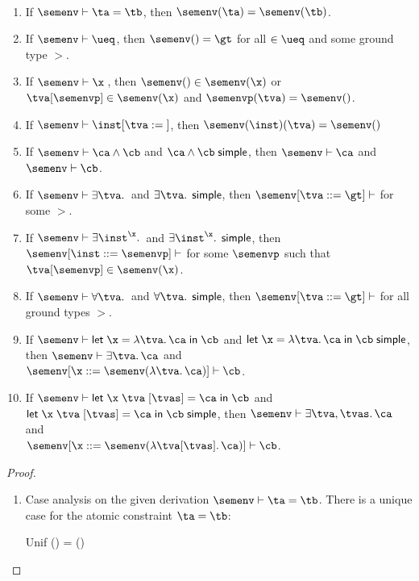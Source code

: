 \documentclass[acmsmall,screen,nonacm,review]{acmart}
\begin{document}
\begin{lemma}~
  \label{lem:simple-inversion}
  \begin{enumerate}[(\roman*)]
    \item If $\semenv \th \cunif \ta \tb$, then $\semenv(\ta) = \semenv(\tb)$.
    \item If $\semenv \th \ueq$, then $\semenv(\t) = \gt$ for all $\t \in \ueq$ and some ground type $\gt$.
    \item If $\semenv \th \capp \x \t$, then $\semenv(\t) \in \semenv(\x)$ or $\greg \tv \semenvp \in \semenv(\x)$ and $\semenvp(\tv) = \semenv(\t)$.
    \item If $\semenv \th \cpinst \inst \tv \t$, then $\semenv(\inst)(\tv) = \semenv(\t)$

    \item If $\semenv \th \ca \cand \cb$ and $\ca \cand \cb \simple$, then $\semenv \th \ca$ and $\semenv \th \cb$.
    \item If $\semenv \th \cexists \tv \c$ and $\cexists \tv \c \simple$, then $\semenv\where{\tv \is \gt} \th \c$ for some $\gt$.
    \item If $\semenv \th \cexistsi \inst \x \c$ and $\cexistsi \inst \x \c \simple$, then $\semenv\where{\inst \is \semenvp} \th \c$ for some $\semenvp$ such that $\greg \tv \semenvp \in \semenv(\x)$.
    \item If $\semenv \th \cfor \tv \c$ and $\cfor \tv \c \simple$, then $\semenv\where{\tv \is \gt} \th \c$ for all ground types $\gt$.
    \item If $\semenv \th \clet \x \tv \ca \cb$ and $\clet \x \tv \ca \cb \simple$, then $\semenv \th \cexists \tv \ca$ and \\$\semenv\where{\x \is \semenv(\cabs \tv \ca)} \th \cb$.
    \item If $\semenv \th \cletr \x \tv \tvs \ca \cb$ and $\cletr \x \tv \tvs \ca \cb \simple$, then
      $\semenv \th \cexists {\tv, \tvs} \ca$ and \\$\semenv\where{\x \is \semenv(\cabsr \tv \tvs \ca)} \th \cb$.
  \end{enumerate}
  \begin{proof}~
    \begin{enumerate}[(\roman*)]
      \item Case analysis on the given derivation $\semenv \th \cunif \ta \tb$.
	There is a unique case for the atomic constraint $\cunif \ta \tb$:
	\begin{proofcases}
	    \proofcasederivation
	      {Unif}
	      {\semenv(\ta) = \semenv(\tb)}
	      {\semenv \th \cunif \ta \tb}


\end{proofcases}
\end{enumerate}
\end{proof}
\end{lemma}
\end{document}
